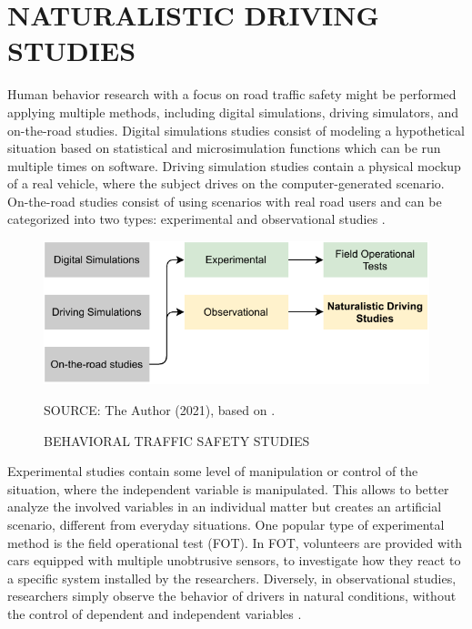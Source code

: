 \section{NATURALISTIC DRIVING STUDIES} \label{nds}

Human behavior research with a focus on road traffic safety might be performed applying multiple methods, including digital simulations, driving simulators, and on-the-road studies. Digital simulations studies consist of modeling a hypothetical situation based on statistical and microsimulation functions which can be run multiple times on software. Driving simulation studies contain a physical mockup of a real vehicle, where the subject drives on the computer-generated scenario. On-the-road studies consist of using scenarios with real road users and can be categorized into two types: experimental and observational studies \cite{Shinar2017}. 

\begin{figure}[!htbp]
    \centering\footnotesize
    \captionsetup{font=footnotesize}
    \caption{BEHAVIORAL TRAFFIC SAFETY STUDIES}
    \includegraphics{fig/studies.pdf}
    \label{fig:shinar}
    \par SOURCE: The Author (2021), based on \textcite{Shinar2017}.
\end{figure}

Experimental studies contain some level of manipulation or control of the situation, where the independent variable is manipulated. This allows to better analyze the involved variables in an individual matter but creates an artificial scenario, different from everyday situations. One popular type of experimental method is the field operational test (FOT). In FOT, volunteers are provided with cars equipped with multiple unobtrusive sensors, to investigate how they react to a specific system installed by the researchers. Diversely, in observational studies, researchers simply observe the behavior of drivers in natural conditions, without the control of dependent and independent variables \cite{Shinar2017}. 

